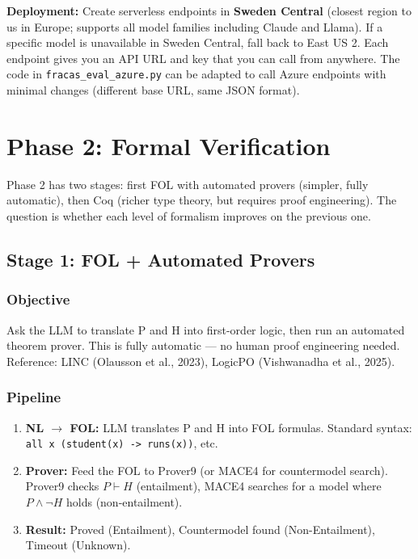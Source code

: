 \documentclass[11pt,a4paper]{article}
\begin{document}
\textbf{Deployment:} Create serverless endpoints in \textbf{Sweden Central} (closest region to us in Europe; supports all model families including Claude and Llama). If a specific model is unavailable in Sweden Central, fall back to East US 2. Each endpoint gives you an API URL and key that you can call from anywhere. The code in \texttt{fracas\_eval\_azure.py} can be adapted to call Azure endpoints with minimal changes (different base URL, same JSON format).

\section{Phase 2: Formal Verification}

Phase 2 has two stages: first FOL with automated provers (simpler, fully automatic), then Coq (richer type theory, but requires proof engineering). The question is whether each level of formalism improves on the previous one.

\subsection{Stage 1: FOL + Automated Provers}

\subsubsection{Objective}

Ask the LLM to translate P and H into first-order logic, then run an automated theorem prover. This is fully automatic --- no human proof engineering needed. Reference: LINC (Olausson et al., 2023), LogicPO (Vishwanadha et al., 2025).

\subsubsection{Pipeline}

\begin{enumerate}[nosep,leftmargin=1.5em]
\item \textbf{NL $\to$ FOL:} LLM translates P and H into FOL formulas. Standard syntax: \texttt{all x (student(x) -> runs(x))}, etc.
\item \textbf{Prover:} Feed the FOL to Prover9 (or MACE4 for countermodel search). Prover9 checks $P \vdash H$ (entailment), MACE4 searches for a model where $P \wedge \neg H$ holds (non-entailment).
\item \textbf{Result:} Proved (Entailment), Countermodel found (Non-Entailment), Timeout (Unknown).
\end{enumerate}
\end{document}
